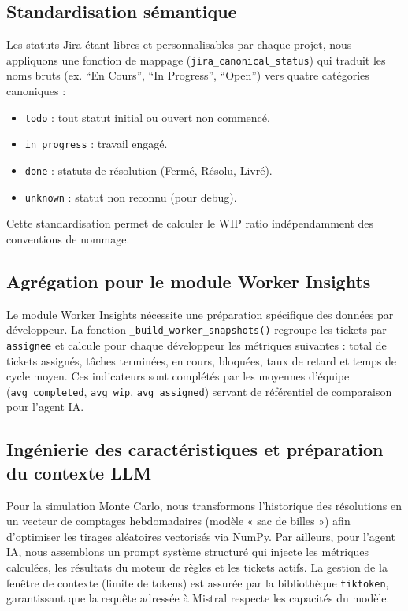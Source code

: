 \subsection{Standardisation sémantique}
Les statuts Jira étant libres et personnalisables par chaque projet, nous appliquons une fonction de mappage (\texttt{jira\_canonical\_status}) qui traduit les noms bruts (ex. “En Cours”, “In Progress”, “Open”) vers quatre catégories canoniques :
\begin{itemize}
    \renewcommand{\labelitemi}{—}
    \item \texttt{todo} : tout statut initial ou ouvert non commencé.
    \item \texttt{in\_progress} : travail engagé.
    \item \texttt{done} : statuts de résolution (Fermé, Résolu, Livré).
    \item \texttt{unknown} : statut non reconnu (pour debug).
\end{itemize}
Cette standardisation permet de calculer le WIP ratio indépendamment des conventions de nommage.

\subsection{Agrégation pour le module Worker Insights}
\label{subsec:worker_aggregation}
Le module Worker Insights nécessite une préparation spécifique des données par développeur. La fonction \texttt{\_build\_worker\_snapshots()} regroupe les tickets par \texttt{assignee} et calcule pour chaque développeur les métriques suivantes : total de tickets assignés, tâches terminées, en cours, bloquées, taux de retard et temps de cycle moyen. Ces indicateurs sont complétés par les moyennes d’équipe (\texttt{avg\_completed}, \texttt{avg\_wip}, \texttt{avg\_assigned}) servant de référentiel de comparaison pour l’agent IA.

\subsection{Ingénierie des caractéristiques et préparation du contexte LLM}
Pour la simulation Monte Carlo, nous transformons l’historique des résolutions en un vecteur de comptages hebdomadaires (modèle « sac de billes ») afin d’optimiser les tirages aléatoires vectorisés via NumPy. Par ailleurs, pour l’agent IA, nous assemblons un prompt système structuré qui injecte les métriques calculées, les résultats du moteur de règles et les tickets actifs. La gestion de la fenêtre de contexte (limite de tokens) est assurée par la bibliothèque \texttt{tiktoken}, garantissant que la requête adressée à Mistral respecte les capacités du modèle.

